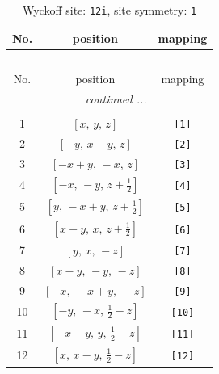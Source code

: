 \documentclass[fleqn,8pt]{jsarticle}
\begin{document}
\renewcommand{\arraystretch}{1.2}
\begin{longtable}{ccc}
\caption{Wyckoff site: {\tt 12i}, site symmetry: {\tt 1}}
 \\
 \hline \hline
No. & position & mapping \\ \hline \endfirsthead

\multicolumn{2}{l}{\tablename\ \thetable{}} \\
 \hline \hline
No. & position & mapping \\ \hline \endhead

 \hline \hline
\multicolumn{2}{r}{\footnotesize\it continued ...} \\ \endfoot

 \hline \hline
\multicolumn{2}{r}{} \\ \endlastfoot

1 & $\left[ x,\, y,\, z \right]$ & {\tt [1]} \\ \hline
2 & $\left[ - y,\, x - y,\, z \right]$ & {\tt [2]} \\ \hline
3 & $\left[ - x + y,\, - x,\, z \right]$ & {\tt [3]} \\ \hline
4 & $\left[ - x,\, - y,\, z + \frac{1}{2} \right]$ & {\tt [4]} \\ \hline
5 & $\left[ y,\, - x + y,\, z + \frac{1}{2} \right]$ & {\tt [5]} \\ \hline
6 & $\left[ x - y,\, x,\, z + \frac{1}{2} \right]$ & {\tt [6]} \\ \hline
7 & $\left[ y,\, x,\, - z \right]$ & {\tt [7]} \\ \hline
8 & $\left[ x - y,\, - y,\, - z \right]$ & {\tt [8]} \\ \hline
9 & $\left[ - x,\, - x + y,\, - z \right]$ & {\tt [9]} \\ \hline
10 & $\left[ - y,\, - x,\, \frac{1}{2} - z \right]$ & {\tt [10]} \\ \hline
11 & $\left[ - x + y,\, y,\, \frac{1}{2} - z \right]$ & {\tt [11]} \\ \hline
12 & $\left[ x,\, x - y,\, \frac{1}{2} - z \right]$ & {\tt [12]} \\
\end{longtable}
\end{document}
